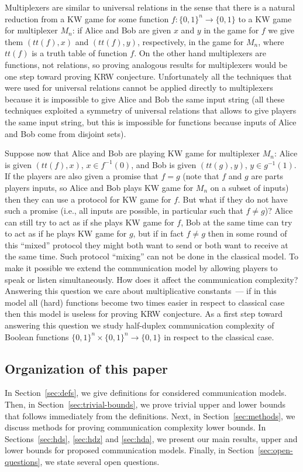 Multiplexers are similar to universal relations in the sense that there is a natural reduction 
from a KW game for some function $f:\{0,1\}^n\to\{0,1\}$ to a KW game for multiplexer $M_n$: if Alice and Bob are given $x$ and $y$ in the game for $f$ we give them $(tt(f), x)$ 
and $(tt(f),y)$, respectively, in the game for $M_n$, where $tt(f)$ is a truth table of function $f$. 
On the other hand multiplexers are functions, not relations, so proving analogous
results for multiplexers would be one step toward proving KRW conjecture.
Unfortunately all the techniques that were used for universal relations cannot be applied directly 
to multiplexers because it is impossible to give Alice and Bob the same input string
(all these techniques exploited a symmetry of universal relations that allows to give players the same input string, but this is impossible for functions because inputs of Alice and Bob come from disjoint sets).

Suppose now that Alice and Bob are playing KW game for multiplexer $M_n$: Alice is
given $(tt(f), x)$, $x\in f^{-1}(0)$, and Bob is given $(tt(g), y)$, $y\in g^{-1}(1)$. If the
players are also given a promise that $f=g$ (note that $f$ and $g$ are parts players inputs, so Alice and Bob plays KW game for $M_n$ on a subset of inputs) then they can use a protocol for KW 
game for $f$. 
But what if they do not have such a promise (i.e., all inputs are possible, in particular such that $f\neq g$)?
Alice can still try to act as if she plays KW game for $f$, 
Bob at the same time can try to act as if he plays KW game for $g$,
but if in fact $f\neq g$ then in some round of this ``mixed'' protocol they might
both want to send or both want to receive at the same time.  
Such protocol ``mixing'' can not be done  in the classical model. 
To make it possible we extend the communication model by 
allowing players to speak or listen simultaneously. How does it affect the communication complexity? Answering this question we care about multiplicative constants~--- 
if in this model all (hard) functions become two times easier in respect to classical case then this model is useless for proving KRW conjecture.
As a first step toward answering this question we study half-duplex communication complexity of Boolean functions $\{0,1\}^n\times\{0,1\}^n\to \{0,1\}$ in respect to the classical case. 

\subsection{Organization of this paper}
In Section~\ref{sec:defs}, we give definitions for considered communication models. Then, in Section~\ref{sec:trivial-bounds}, we prove trivial upper and lower bounds that follows immediately from the definitions. Next, in Section~\ref{sec:methods}, we discuss methods for proving communication complexity lower bounds. In Sections~\ref{sec:hds}, \ref{sec:hdz} and \ref{sec:hda}, we present our main results, upper and lower bounds for proposed communication models. Finally, in Section~\ref{sec:open-questions}, we state several open questions.

